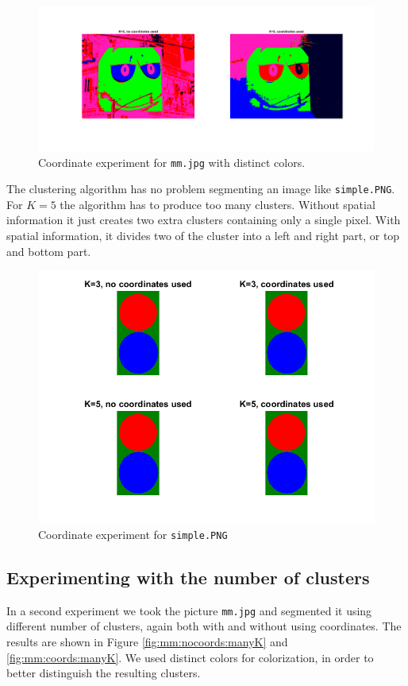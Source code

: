 \begin{figure}[h!]
\centering
\includegraphics[width = 0.9\linewidth]{figures/task2/mm_bad_visibility.png}
\caption{Coordinate experiment for \texttt{mm.jpg} with distinct colors.}
\label{fig:mm:coords:distinct}
\end{figure}

The clustering algorithm has no problem segmenting an image like \texttt{simple.PNG}. For $K=5$ the algorithm has to produce too many clusters. Without spatial information it just creates two extra clusters containing only a single pixel. With spatial information, it divides two of the cluster into a left and right part, or top and bottom part.

\begin{figure}[h!]
\centering
\includegraphics[width = 0.7\linewidth]{figures/task2/simple_coordinates.png}
\caption{Coordinate experiment for \texttt{simple.PNG}}
\label{fig:simple:coords}
\end{figure}

\subsection{Experimenting with the number of clusters}
In a second experiment we took the picture \texttt{mm.jpg} and segmented it using different number of clusters, again both with and without using coordinates. The results are shown in Figure \ref{fig:mm:nocoords:manyK} and \ref{fig:mm:coords:manyK}. We used distinct colors for colorization, in order to better distinguish the resulting clusters.

